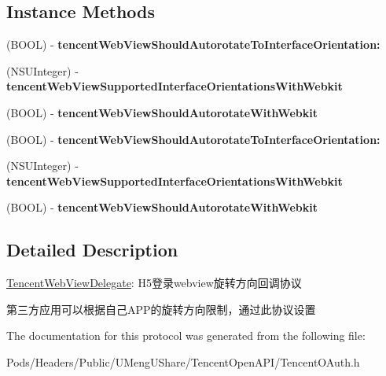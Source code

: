\subsection*{Instance Methods}
\begin{DoxyCompactItemize}
\item 
\mbox{\label{protocol_tencent_web_view_delegate_01-p_a29aad60fa79ed91ee9038bf49772e5db}} 
(B\+O\+OL) -\/ {\bfseries tencent\+Web\+View\+Should\+Autorotate\+To\+Interface\+Orientation\+:}
\item 
\mbox{\label{protocol_tencent_web_view_delegate_01-p_ae15f45e35d1fc4280e5defb58e037435}} 
(N\+S\+U\+Integer) -\/ {\bfseries tencent\+Web\+View\+Supported\+Interface\+Orientations\+With\+Webkit}
\item 
\mbox{\label{protocol_tencent_web_view_delegate_01-p_a1bd524d0f4d577662a4e39df06f46c51}} 
(B\+O\+OL) -\/ {\bfseries tencent\+Web\+View\+Should\+Autorotate\+With\+Webkit}
\item 
\mbox{\label{protocol_tencent_web_view_delegate_01-p_a29aad60fa79ed91ee9038bf49772e5db}} 
(B\+O\+OL) -\/ {\bfseries tencent\+Web\+View\+Should\+Autorotate\+To\+Interface\+Orientation\+:}
\item 
\mbox{\label{protocol_tencent_web_view_delegate_01-p_ae15f45e35d1fc4280e5defb58e037435}} 
(N\+S\+U\+Integer) -\/ {\bfseries tencent\+Web\+View\+Supported\+Interface\+Orientations\+With\+Webkit}
\item 
\mbox{\label{protocol_tencent_web_view_delegate_01-p_a1bd524d0f4d577662a4e39df06f46c51}} 
(B\+O\+OL) -\/ {\bfseries tencent\+Web\+View\+Should\+Autorotate\+With\+Webkit}
\end{DoxyCompactItemize}


\subsection{Detailed Description}
\mbox{\hyperlink{class_tencent_web_view_delegate-p}{Tencent\+Web\+View\+Delegate}}\+: H5登录webview旋转方向回调协议 

第三方应用可以根据自己\+A\+P\+P的旋转方向限制，通过此协议设置 

The documentation for this protocol was generated from the following file\+:\begin{DoxyCompactItemize}
\item 
Pods/\+Headers/\+Public/\+U\+Meng\+U\+Share/\+Tencent\+Open\+A\+P\+I/Tencent\+O\+Auth.\+h\end{DoxyCompactItemize}
